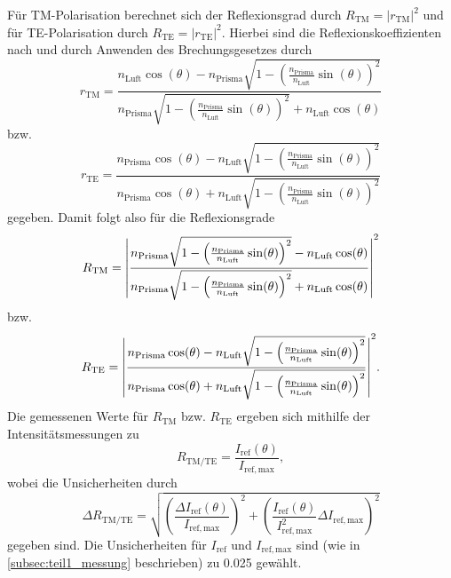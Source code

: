 Für TM-Polarisation berechnet sich der Reflexionsgrad durch $R_{\mathrm{TM}} = |r_{\mathrm{TM}}|^2$ und für TE-Polarisation durch $R_{\mathrm{TE}} = |r_{\mathrm{TE}}|^2$.
Hierbei sind die Reflexionskoeffizienten nach \cite{linden_optik} und durch Anwenden des Brechungsgesetzes durch
\begin{equation*}
    r_{\mathrm{TM}} = \frac{n_{\mathrm{Luft}}\cos(\theta) - n_{\mathrm{Prisma}}\sqrt{1 - \left(\frac{n_{\mathrm{Prisma}}}{n_{\mathrm{Luft}}}\sin(\theta)\right)^2}}{n_{\mathrm{Prisma}}\sqrt{1 - \left(\frac{n_{\mathrm{Prisma}}}{n_{\mathrm{Luft}}}\sin(\theta)\right)^2} + n_{\mathrm{Luft}}\cos(\theta)}
\end{equation*} bzw.
\begin{equation*}
    r_{\mathrm{TE}} = \frac{n_{\mathrm{Prisma}}\cos(\theta) - n_{\mathrm{Luft}}\sqrt{1 - \left(\frac{n_{\mathrm{Prisma}}}{n_{\mathrm{Luft}}}\sin(\theta)\right)^2}}{n_{\mathrm{Prisma}}\cos(\theta) + n_{\mathrm{Luft}}\sqrt{1 - \left(\frac{n_{\mathrm{Prisma}}}{n_{\mathrm{Luft}}}\sin(\theta)\right)^2}}
\end{equation*} gegeben. Damit folgt also für die Reflexionsgrade
\begin{equation}\label{eq:reflexionsgrad_tm}
    R_{\mathrm{TM}} = \abs{\frac{n_{\mathrm{Prisma}}\sqrt{1 - \left(\frac{n_{\mathrm{Prisma}}}{n_{\mathrm{Luft}}}\sin(\theta)\right)^2} - n_{\mathrm{Luft}}\cos(\theta)}{n_{\mathrm{Prisma}}\sqrt{1 - \left(\frac{n_{\mathrm{Prisma}}}{n_{\mathrm{Luft}}}\sin(\theta)\right)^2} + n_{\mathrm{Luft}}\cos(\theta)}}^2
\end{equation} bzw.
\begin{equation}\label{eq:reflexionsgrad_te}
    R_{\mathrm{TE}} = \abs{\frac{n_{\mathrm{Prisma}}\cos(\theta) - n_{\mathrm{Luft}}\sqrt{1 - \left(\frac{n_{\mathrm{Prisma}}}{n_{\mathrm{Luft}}}\sin(\theta)\right)^2}}{n_{\mathrm{Prisma}}\cos(\theta) + n_{\mathrm{Luft}}\sqrt{1 - \left(\frac{n_{\mathrm{Prisma}}}{n_{\mathrm{Luft}}}\sin(\theta)\right)^2}}}^2 .
\end{equation} Die gemessenen Werte für $R_{\mathrm{TM}}$ bzw. $R_{\mathrm{TE}}$ ergeben sich mithilfe der Intensitätsmessungen zu
\begin{equation}\label{eq:reflexionsgrad_gemessen}
    R_{\mathrm{TM/TE}} = \frac{I_{\mathrm{ref}}(\theta)}{I_{\mathrm{ref,max}}} ,
\end{equation} wobei die Unsicherheiten durch
\begin{equation*}
    \Delta R_{\mathrm{TM/TE}} = \sqrt{\left(\frac{\Delta I_{\mathrm{ref}}(\theta)}{I_{\mathrm{ref,max}}}\right)^2 + \left(\frac{I_{\mathrm{ref}}(\theta)}{I_{\mathrm{ref,max}}^2}\Delta I_{\mathrm{ref,max}}\right)^2}
\end{equation*} gegeben sind. Die Unsicherheiten für $I_{\mathrm{ref}}$ und $I_{\mathrm{ref,max}}$ sind (wie in \cref{subsec:teil1_messung} beschrieben) zu \SI{0.025}{\we} gewählt.
